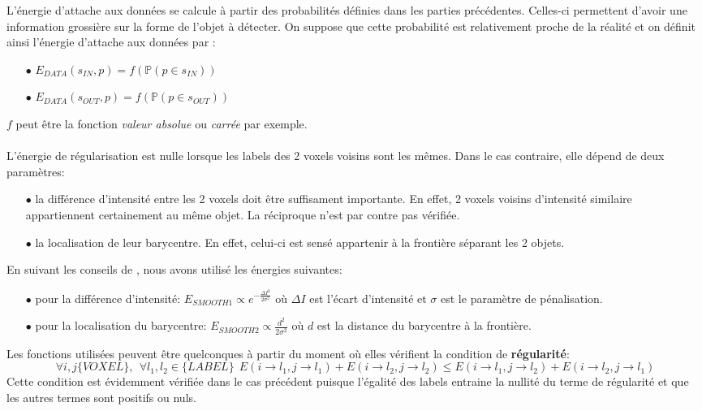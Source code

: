 \documentclass{article}
\begin{document}
L'énergie d'attache aux données se calcule à partir des probabilités définies dans les parties précédentes. Celles-ci permettent d'avoir une information grossière sur la forme de l'objet à détecter. On suppose que cette probabilité est relativement proche de la réalité et on définit ainsi l'énergie d'attache aux données par :
\begin{center}
\begin{itemize}
	\item[$\bullet$] $E_{DATA}(s_{IN}, p) = f(\mathbb{P}(p \in s_{IN}))$
	\item[$\bullet$] $E_{DATA}(s_{OUT}, p) =f( \mathbb{P}(p \in s_{OUT}))$
\end{itemize}
\end{center}
$f$ peut être la fonction \textit{valeur absolue} ou \textit{carrée} par exemple.
\\
\\
L'énergie de régularisation est nulle lorsque les labels des 2 voxels voisins sont les mêmes. Dans le cas contraire, elle dépend de deux paramètres:
\begin{itemize}
	\item[$\bullet$] la différence d'intensité entre les 2 voxels doit être suffisament importante. En effet, 2 voxels voisins d'intensité similaire appartiennent certainement au même objet. La réciproque n'est par contre pas vérifiée.
	\item[$\bullet$] la localisation de leur barycentre. En effet, celui-ci est sensé appartenir à la frontière séparant les 2 objets.
\end{itemize}
En suivant les conseils de \cite{bib:seg}, nous avons utilisé les énergies suivantes:
\begin{itemize}
	\item[$\bullet$] pour la différence d'intensité: $E_{SMOOTH 1} \varpropto e^{-\frac{\Delta I^2}{2\sigma^2}}$ où $\Delta I$ est l'écart d'intensité et $\sigma$ est le paramètre de pénalisation.
	\item[$\bullet$] pour la localisation du barycentre: $E_{SMOOTH 2} \varpropto  \frac{d^2}{2\sigma^2}$ où $d$ est la distance du barycentre à la frontière.
\end{itemize}
Les fonctions utilisées peuvent être quelconques à partir du moment où elles vérifient la condition de \textbf{régularité}:
\begin{equation*}
\forall i, j \{VOXEL\}, \ \ \forall l_1, l_2 \in \{LABEL\}\ \  E(i\rightarrow l_1, j\rightarrow l_1) + E(i\rightarrow l_2, j\rightarrow l_2) \leq E(i\rightarrow l_1, j\rightarrow l_2) + E(i\rightarrow l_2, j\rightarrow l_1)
\end{equation*}
Cette condition est évidemment vérifiée dans le cas précédent puisque l'égalité des labels entraine la nullité du terme de régularité et que les autres termes sont positifs ou nuls.
\end{document}
